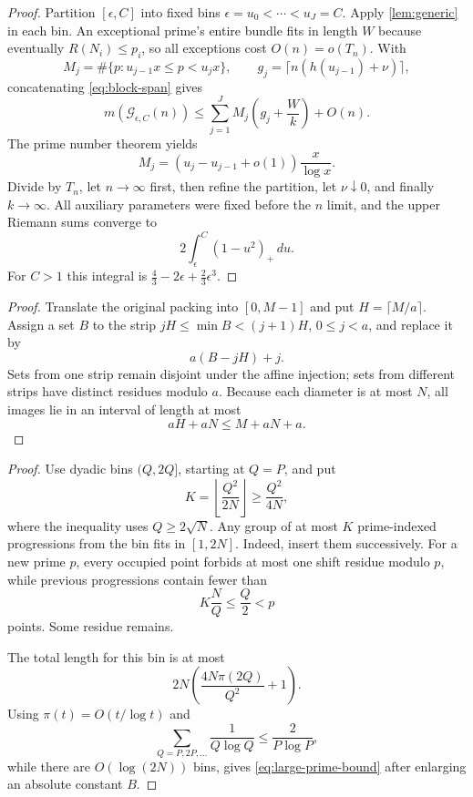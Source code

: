 \documentclass[11pt,a4paper]{article}
\theoremstyle{plain}
\theoremstyle{definition}
\theoremstyle{remark}
\newcommand{\cG}{\mathcal G}
\begin{document}
\begin{proof}
Partition $[\epsilon,C]$ into fixed bins $\epsilon=u_0<\cdots<u_J=C$. Apply \cref{lem:generic} in each bin. An exceptional prime's entire bundle fits in length $W$ because eventually $R(N_i)\le p_i$, so all exceptions cost $O(n)=o(T_n)$. With
\[
 M_j=\#\{p:u_{j-1}x\le p<u_jx\},\qquad
 g_j=\lceil n(h(u_{j-1})+\nu)\rceil,
\]
concatenating \eqref{eq:block-span} gives
\[
 m(\cG_{\epsilon,C}(n))
 \le\sum_{j=1}^JM_j\left(g_j+\frac Wk\right)+O(n).
\]
The prime number theorem yields
\[
 M_j=(u_j-u_{j-1}+o(1))\frac{x}{\log x}.
\]
Divide by $T_n$, let $n\to\infty$ first, then refine the partition, let $\nu\downarrow0$, and finally $k\to\infty$. All auxiliary parameters were fixed before the $n$ limit, and the upper Riemann sums converge to
\[
 2\int_\epsilon^C(1-u^2)_+\,du.
\]
For $C>1$ this integral is $\frac43-2\epsilon+\frac23\epsilon^3$.
\end{proof}

\label{pf:fold}
\lemfold*
\begin{proof}
Translate the original packing into $[0,M-1]$ and put $H=\lceil M/a\rceil$. Assign a set $B$ to the strip $jH\le\min B<(j+1)H$, $0\le j<a$, and replace it by
\[
 a(B-jH)+j.
\]
Sets from one strip remain disjoint under the affine injection; sets from different strips have distinct residues modulo $a$. Because each diameter is at most $N$, all images lie in an interval of length at most
\[
 aH+aN\le M+aN+a.
\]
\end{proof}

\label{pf:largeprime}
\lemlargeprime*
\begin{proof}
Use dyadic bins $(Q,2Q]$, starting at $Q=P$, and put
\[
 K=\left\lfloor\frac{Q^2}{2N}\right\rfloor
 \ge\frac{Q^2}{4N},
\]
where the inequality uses $Q\ge2\sqrt N$. Any group of at most $K$ prime-indexed progressions from the bin fits in $[1,2N]$. Indeed, insert them successively. For a new prime $p$, every occupied point forbids at most one shift residue modulo $p$, while previous progressions contain fewer than
\[
 K\frac NQ\le\frac Q2<p
\]
points. Some residue remains.

The total length for this bin is at most
\[
 2N\left(\frac{4N\pi(2Q)}{Q^2}+1\right).
\]
Using $\pi(t)=O(t/\log t)$ and
\[
 \sum_{Q=P,2P,\ldots}\frac1{Q\log Q}\le\frac2{P\log P},
\]
while there are $O(\log(2N))$ bins, gives \eqref{eq:large-prime-bound} after enlarging an absolute constant $B$.
\end{proof}
\end{document}

